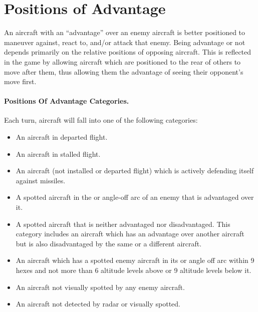 \section{Positions of Advantage}
\label{rule:positions-of-advantage}

An aircraft with an “advantage” over an enemy aircraft is better positioned to maneuver against, react to, and/or attack that enemy. Being advantage or not depends primarily on the relative positions of opposing aircraft. This is reflected in the game by allowing aircraft which are positioned to the rear of others to move after them, thus allowing them the advantage of seeing their opponent's move first.

\paragraph{Positions Of Advantage Categories.} Each turn, aircraft will fall into one of the following categories:

\begin{itemize}


    \item{} An aircraft in departed flight.

    \item{} An aircraft in stalled flight.

    \item{} An aircraft (not installed or departed flight) which is actively defending itself against missiles.

    \item{} A spotted aircraft in the  or  angle-off arc of an enemy that is advantaged over it.

    \item{} A spotted aircraft that is neither advantaged nor disadvantaged. This category includes an aircraft which has an advantage over another aircraft but is also disadvantaged by the same or a different aircraft.

    \item{} An aircraft which has a spotted enemy aircraft in its  or  angle off arc within 9 hexes and not more than 6 altitude levels above or 9 altitude levels below it. 

    \item{} An aircraft not visually spotted by any enemy aircraft.

    \item{} An aircraft not detected by radar or visually spotted.

\end{itemize}

